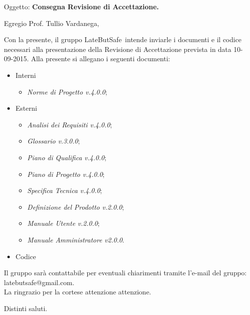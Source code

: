 \documentclass{letter}
\makeatletter
\newcommand{\DefinizioneDelProdotto}{\textit{Definizione del Prodotto v.2.0.0}}
\newcommand{\SpecificaTecnica}{\textit{Specifica Tecnica v.4.0.0}}
\newcommand{\AnalisiDeiRequisiti}{\textit{Analisi dei Requisiti v.4.0.0}}
\newcommand{\PianoDiProgetto}{\textit{Piano di Progetto v.4.0.0}}
\newcommand{\NormeDiProgetto}{\textit{Norme di Progetto v.4.0.0}}
\newcommand{\PianoDiQualifica}{\textit{Piano di Qualifica v.4.0.0}}
\newcommand{\ManualeUtente}{\textit{Manuale Utente v.2.0.0}}
\newcommand{\ManualeAmministratore}{\textit{Manuale Amministratore v2.0.0}}
\newcommand{\Glossario}{\textit{Glossario v.3.0.0}}
\newcommand{\gruppo}{LateButSafe}
\newcommand{\mail}{latebutsafe@gmail.com}
\newcommand{\Vardanega}{Prof. Tullio Vardanega}
\makeatother
\begin{document}
	
	\begin{letter}{Oggetto: \textbf{Consegna Revisione di Accettazione.}}
	\opening {Egregio \Vardanega ,}
	Con la presente, il gruppo \gruppo\ intende inviarle i documenti e il codice necessari alla presentazione della Revisione di Accettazione prevista in data 10-09-2015.
	Alla presente si allegano i seguenti documenti:
			\begin{itemize}
				\item Interni
					\begin{itemize}
						\item \NormeDiProgetto;
					\end{itemize}
				\item Esterni
					\begin{itemize}
						\item \AnalisiDeiRequisiti;
						\item \Glossario;
						\item \PianoDiQualifica;
						\item \PianoDiProgetto;
						\item \SpecificaTecnica;
						\item \DefinizioneDelProdotto;
						\item \ManualeUtente;
						\item \ManualeAmministratore.
					\end{itemize}
				\item Codice
			\end{itemize} 
		Il gruppo sarà  contattabile per eventuali chiarimenti tramite l'e-mail del gruppo: \mail.	\\
		La ringrazio per la cortese attenzione attenzione.
		
		\thispagestyle{fancy}
		\closing{Distinti saluti.}
		\signature{Manuel Fossa\\
					Responsabile di Progetto\\
					\gruppo}
   \end{letter}
\end{document}

